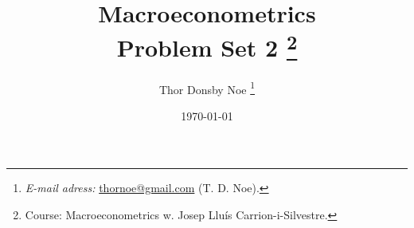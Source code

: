 \titlehead{ \centering\texttt{[image: 03\_figures/logo]}}

\title{\Huge Macroeconometrics %
\\ \huge Problem Set 2 %
\thanks{Course: Macroeconometrics w. Josep Lluís Carrion-i-Silvestre.
}
}

\author[a]{Thor Donsby Noe
\thanks{ %
\textit{E-mail adress:} \href{mailto:thornoe@gmail.com}{thornoe@gmail.com} (T. D. Noe).}
}

\date{\normalsize \today %
  }

%         
